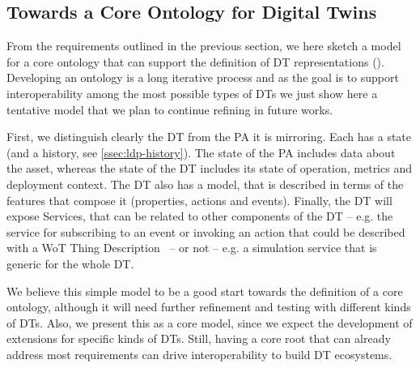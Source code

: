 
\subsection{Towards a Core Ontology for Digital Twins}

From the requirements outlined in the previous section, we here sketch a model for a core ontology that can support the definition of DT representations ().
%
Developing an ontology is a long iterative process and as the goal is to support interoperability among the most possible types of DTs we just show here a tentative model that we plan to continue refining in future works.

First, we distinguish clearly the DT from the PA it is mirroring.
Each has a state (and a history, see \cref{ssec:ldp-history}).
The state of the PA includes data about the asset, whereas the state of the DT includes its state of operation, metrics and deployment context.
The DT also has a model, that is described in terms of the features that compose it (properties, actions and events).
Finally, the DT will expose Services, that can be related to other components of the DT -- e.g. the service for subscribing to an event or invoking an action that could be described with a WoT Thing Description~\cite{wotTD} -- or not -- e.g. a simulation service that is generic for the whole DT.

We believe this simple model to be a good start towards the definition of a core ontology, although it will need further refinement and testing with different kinds of DTs.
%
Also, we present this as a core model, since we expect the development of extensions for specific kinds of DTs. Still, having a core root that can already address most requirements can drive interoperability to build DT ecosystems.

